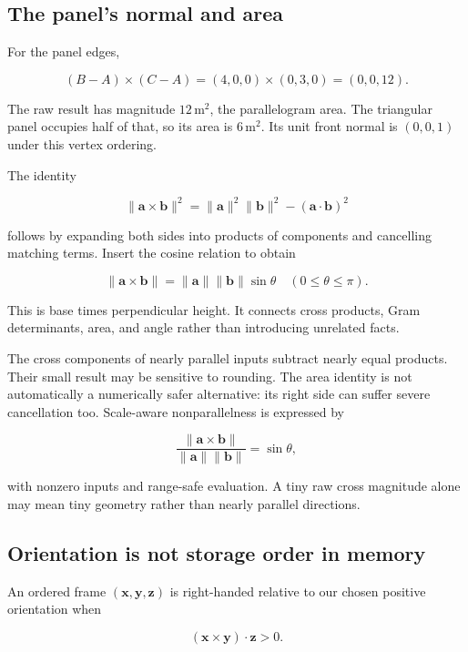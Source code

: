\subsection{The panel's normal and area}\label{01-foundations-i-ch017-the-panels-normal-and-area}

For the panel edges,

\[
(B-A)\times(C-A)=(4,0,0)\times(0,3,0)=(0,0,12).
\]

The raw result has magnitude \(12\,\mathrm{m}^2\), the parallelogram area. The triangular panel occupies half of that, so its area is \(6\,\mathrm{m}^2\). Its unit front normal is \((0,0,1)\) under this vertex ordering.

The identity

\[
\|\mathbf a\times\mathbf b\|^2
=\|\mathbf a\|^2\|\mathbf b\|^2-(\mathbf a\cdot\mathbf b)^2
\]

follows by expanding both sides into products of components and cancelling matching terms. Insert the cosine relation to obtain

\[
\|\mathbf a\times\mathbf b\|=\|\mathbf a\|\|\mathbf b\|\sin\theta
\quad(0\le\theta\le\pi).
\]

This is base times perpendicular height. It connects cross products, Gram determinants, area, and angle rather than introducing unrelated facts.

The cross components of nearly parallel inputs subtract nearly equal products. Their small result may be sensitive to rounding. The area identity is not automatically a numerically safer alternative: its right side can suffer severe cancellation too. Scale-aware nonparallelness is expressed by

\[
\frac{\|\mathbf a\times\mathbf b\|}{\|\mathbf a\|\|\mathbf b\|}=\sin\theta,
\]

with nonzero inputs and range-safe evaluation. A tiny raw cross magnitude alone may mean tiny geometry rather than nearly parallel directions.

\subsection{Orientation is not storage order in memory}\label{01-foundations-i-ch017-orientation-is-not-storage-order-in-memory}

An ordered frame \((\mathbf x,\mathbf y,\mathbf z)\) is right-handed relative to our chosen positive orientation when

\[
(\mathbf x\times\mathbf y)\cdot\mathbf z>0.
\]

